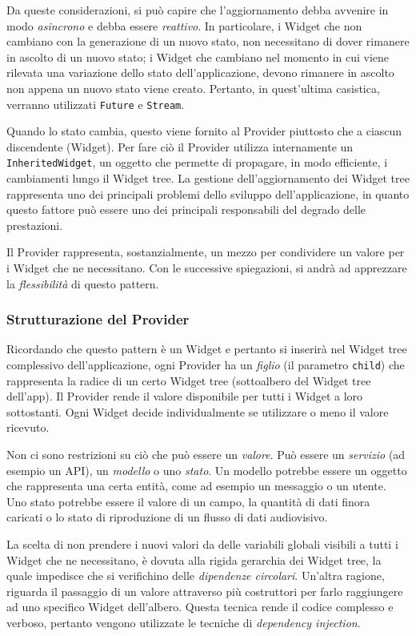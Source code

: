 Da queste considerazioni, si può capire che l'aggiornamento debba avvenire in modo \textit{asincrono} e debba essere \textit{reattivo}. In particolare, i Widget che non cambiano con la generazione di un nuovo stato, non necessitano di dover rimanere in ascolto di un nuovo stato; i Widget che cambiano nel momento in cui viene rilevata una variazione dello stato dell'applicazione, devono rimanere in ascolto non appena un nuovo stato viene creato. Pertanto, in quest'ultima casistica, verranno utilizzati \verb|Future| e \verb|Stream|. 

Quando lo stato cambia, questo viene fornito al Provider piuttosto che a ciascun discendente (Widget). Per fare ciò il Provider utilizza internamente un \verb|InheritedWidget|, un oggetto che permette di propagare, in modo efficiente, i cambiamenti lungo il Widget tree. La gestione dell'aggiornamento dei Widget tree rappresenta uno dei principali problemi dello sviluppo dell'applicazione, in quanto questo fattore può essere uno dei principali responsabili del degrado delle prestazioni.

Il Provider rappresenta, sostanzialmente, un mezzo per condividere un valore per i Widget che ne necessitano. Con le successive spiegazioni, si andrà ad apprezzare la \textit{flessibilità} di questo pattern.

\subsubsection{Strutturazione del Provider}
Ricordando che questo pattern è un Widget e pertanto si inserirà nel Widget tree complessivo dell'applicazione, ogni Provider ha un \textit{figlio} (il parametro \verb|child|) che rappresenta la radice di un certo Widget tree (sottoalbero del Widget tree dell'app). Il Provider rende il valore disponibile per tutti i Widget a loro sottostanti. Ogni Widget decide individualmente se utilizzare o meno il valore ricevuto.

Non ci sono restrizioni su ciò che può essere un \textit{valore}. Può essere un \textit{servizio} (ad esempio un API), un \textit{modello} o uno \textit{stato}. Un modello potrebbe essere un oggetto che rappresenta una certa entità, come ad esempio un messaggio o un utente. Uno stato potrebbe essere il valore di un campo, la quantità di dati finora caricati o lo stato di riproduzione di un flusso di dati audiovisivo.

La scelta di non prendere i nuovi valori da delle variabili globali visibili a tutti i Widget che ne necessitano, è dovuta alla rigida gerarchia dei Widget tree, la quale impedisce che si verifichino delle \textit{dipendenze circolari}. Un'altra ragione, riguarda il passaggio di un valore attraverso più costruttori per farlo raggiungere ad uno specifico Widget dell'albero. Questa tecnica rende il codice complesso e verboso, pertanto vengono utilizzate le tecniche di \textit{dependency injection}.

